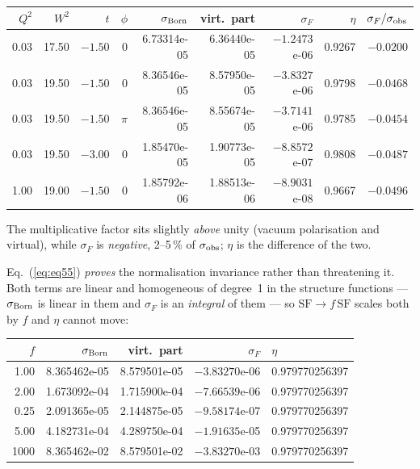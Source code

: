 \documentclass[11pt]{article}
\begin{document}
\begin{center}\small
\begin{tabular}{rrrrrrrrr}
\toprule
$Q^2$ & $W^2$ & $t$ & $\phi$ & $\sigma_{\rm Born}$ & virt.\ part & $\sigma_F$ & $\eta$ & $\sigma_F/\sigma_{\rm obs}$ \\
\midrule
0.03 & 17.50 & $-1.50$ & 0 & 6.73314e-05 & 6.36440e-05 & $-1.2473$e-06 & 0.9267 & $-0.0200$ \\
0.03 & 19.50 & $-1.50$ & 0 & 8.36546e-05 & 8.57950e-05 & $-3.8327$e-06 & 0.9798 & $-0.0468$ \\
0.03 & 19.50 & $-1.50$ & $\pi$ & 8.36546e-05 & 8.55674e-05 & $-3.7141$e-06 & 0.9785 & $-0.0454$ \\
0.03 & 19.50 & $-3.00$ & 0 & 1.85470e-05 & 1.90773e-05 & $-8.8572$e-07 & 0.9808 & $-0.0487$ \\
1.00 & 19.00 & $-1.50$ & 0 & 1.85792e-06 & 1.88513e-06 & $-8.9031$e-08 & 0.9667 & $-0.0496$ \\
\bottomrule
\end{tabular}
\end{center}

The multiplicative factor sits slightly \emph{above} unity (vacuum polarisation and virtual), while
$\sigma_F$ is \emph{negative}, 2--5\,\% of $\sigma_{\rm obs}$; $\eta$ is the difference of the two.

Eq.~(\ref{eq:eq55}) \emph{proves} the normalisation invariance rather than threatening it. Both
terms are linear and homogeneous of degree~1 in the structure functions --- $\sigma_{\rm Born}$ is
linear in them and $\sigma_F$ is an \emph{integral} of them --- so $\mathrm{SF}\to f\,\mathrm{SF}$
scales both by $f$ and $\eta$ cannot move:

\begin{center}\small
\begin{tabular}{rrrrl}
\toprule
$f$ & $\sigma_{\rm Born}$ & virt.\ part & $\sigma_F$ & $\eta$ \\
\midrule
1.00 & 8.365462e-05 & 8.579501e-05 & $-3.83270$e-06 & 0.979770256397 \\
2.00 & 1.673092e-04 & 1.715900e-04 & $-7.66539$e-06 & 0.979770256397 \\
0.25 & 2.091365e-05 & 2.144875e-05 & $-9.58174$e-07 & 0.979770256397 \\
5.00 & 4.182731e-04 & 4.289750e-04 & $-1.91635$e-05 & 0.979770256397 \\
1000 & 8.365462e-02 & 8.579501e-02 & $-3.83270$e-03 & 0.979770256397 \\
\bottomrule
\end{tabular}
\end{center}
\end{document}
